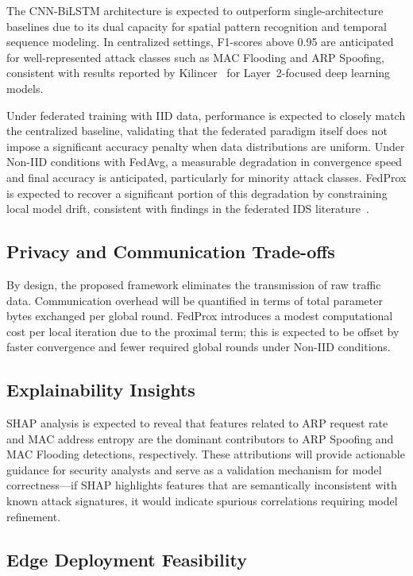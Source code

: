 \documentclass[conference]{IEEEtran}
\begin{document}
The CNN-BiLSTM architecture is expected to outperform single-architecture baselines
due to its dual capacity for spatial pattern recognition and temporal sequence modeling.
In centralized settings, F1-scores above 0.95 are anticipated for well-represented
attack classes such as MAC Flooding and ARP Spoofing, consistent with results reported
by Kilincer~\cite{kilincer2025} for Layer~2-focused deep learning models.

Under federated training with IID data, performance is expected to closely match the
centralized baseline, validating that the federated paradigm itself does not impose
a significant accuracy penalty when data distributions are uniform. Under Non-IID
conditions with FedAvg, a measurable degradation in convergence speed and final
accuracy is anticipated, particularly for minority attack classes. FedProx is expected
to recover a significant portion of this degradation by constraining local model drift,
consistent with findings in the federated IDS literature~\cite{belenguer2025}.

\subsection{Privacy and Communication Trade-offs}

By design, the proposed framework eliminates the transmission of raw traffic data.
Communication overhead will be quantified in terms of total parameter bytes exchanged
per global round. FedProx introduces a modest computational cost per local iteration
due to the proximal term; this is expected to be offset by faster convergence and
fewer required global rounds under Non-IID conditions.

\subsection{Explainability Insights}

SHAP analysis is expected to reveal that features related to ARP request rate and MAC
address entropy are the dominant contributors to ARP Spoofing and MAC Flooding
detections, respectively. These attributions will provide actionable guidance for
security analysts and serve as a validation mechanism for model correctness---if
SHAP highlights features that are semantically inconsistent with known attack
signatures, it would indicate spurious correlations requiring model refinement.

\subsection{Edge Deployment Feasibility}
\end{document}
